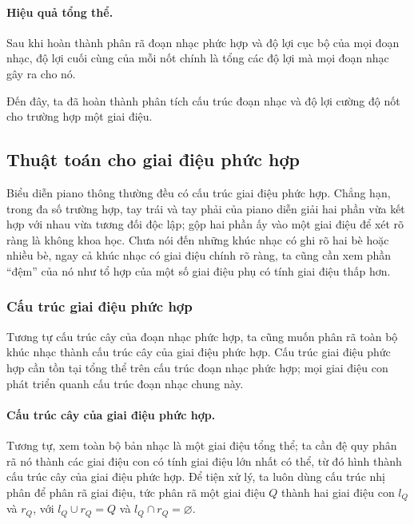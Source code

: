\documentclass[11pt]{article}
\begin{document}
\paragraph{Hiệu quả tổng thể.}
Sau khi hoàn thành phân rã đoạn nhạc phức hợp và độ lợi cục bộ của mọi đoạn
nhạc, độ lợi cuối cùng của mỗi nốt chính là tổng các độ lợi mà mọi đoạn nhạc
gây ra cho nó.

Đến đây, ta đã hoàn thành phân tích cấu trúc đoạn nhạc và độ lợi cường độ nốt
cho trường hợp một giai điệu.

\subsection{Thuật toán cho giai điệu phức hợp}

Biểu diễn piano thông thường đều có cấu trúc giai điệu phức hợp. Chẳng hạn,
trong đa số trường hợp, tay trái và tay phải của piano diễn giải hai phần vừa
kết hợp với nhau vừa tương đối độc lập; gộp hai phần ấy vào một giai điệu để
xét rõ ràng là không khoa học. Chưa nói đến những khúc nhạc có ghi rõ hai bè
hoặc nhiều bè, ngay cả khúc nhạc có giai điệu chính rõ ràng, ta cũng cần xem
phần ``đệm'' của nó như tổ hợp của một số giai điệu phụ có tính giai điệu
thấp hơn.

\subsubsection{Cấu trúc giai điệu phức hợp}

Tương tự cấu trúc cây của đoạn nhạc phức hợp, ta cũng muốn phân rã toàn bộ
khúc nhạc thành cấu trúc cây của giai điệu phức hợp. Cấu trúc giai điệu phức
hợp cần tồn tại tổng thể trên cấu trúc đoạn nhạc phức hợp; mọi giai điệu con
phát triển quanh cấu trúc đoạn nhạc chung này.

\paragraph{Cấu trúc cây của giai điệu phức hợp.}
Tương tự, xem toàn bộ bản nhạc là một giai điệu tổng thể; ta cần đệ quy phân
rã nó thành các giai điệu con có tính giai điệu lớn nhất có thể, từ đó hình
thành cấu trúc cây của giai điệu phức hợp. Để tiện xử lý, ta luôn dùng cấu
trúc nhị phân để phân rã giai điệu, tức phân rã một giai điệu \(Q\) thành hai
giai điệu con \(l_Q\) và \(r_Q\), với \(l_Q\cup r_Q=Q\) và
\(l_Q\cap r_Q=\varnothing\).
\end{document}
